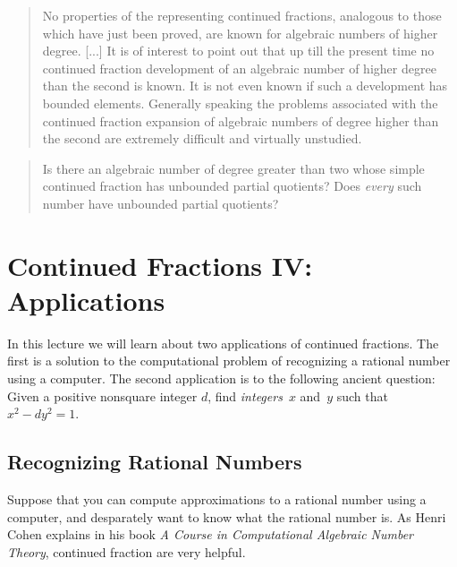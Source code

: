 \documentclass[11pt]{report}
\begin{document}
\vspace{2ex}
\begin{quote}
  No properties of the representing continued fractions,
  analogous to those which have just been proved, are known
  for algebraic numbers of higher degree.  [...] It is of
  interest to point out that up till the present time no
  continued fraction development of an algebraic
  number of higher degree than the second is known.
  It is not even known if such a development  has bounded
  elements.  Generally speaking the problems associated with
  the continued fraction expansion of algebraic numbers of degree
  higher than the second are extremely difficult and virtually
  unstudied.
\end{quote}

\vspace{1ex}
\begin{quote}
  Is there an algebraic number of degree greater than two whose simple
  continued fraction has unbounded partial quotients?
  Does {\em every} such number have unbounded partial quotients?
\end{quote}




\chapter{Continued Fractions IV: Applications}



In this lecture we will learn about two applications of continued
fractions.  The first is a solution to the computational
problem of recognizing a rational number using a computer.  The second
application is to the following ancient question: Given a positive nonsquare
integer $d$, find {\em integers}~$x$ and~$y$ such that $x^2 - dy^2 = 1$.

\section{Recognizing Rational Numbers}
Suppose that you can compute approximations to a rational number using a
computer, and desparately want to know what the rational number is.
As Henri Cohen explains in his book {\em A Course in Computational
    Algebraic Number Theory}, continued fraction are very helpful.
\end{document}
